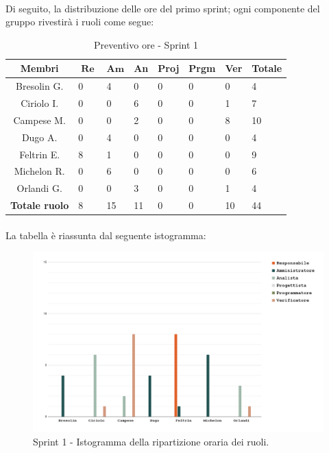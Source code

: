 \documentclass[10pt, a4paper]{article}
\begin{document}
{{{{{{{{\paragraph{}Di seguito, la distribuzione delle ore del primo sprint; ogni componente del gruppo rivestirà i ruoli come segue:
\begin{table}[H]
\begin{tabularx}{\textwidth}{c|X|X|X|X|X|X|X}
        \textbf{Membri} & $\operatorname{\textbf{Re}}$ & $\mathrm{\textbf{Am}}$ & \textbf{An} & \textbf{Proj} & \textbf{Prgm} & \textbf{Ver} & \textbf{Totale} \\
        \hline Bresolin G. & 0 & \cellcolor{primarycolor}4 & 0 & 0 & 0 & 0 & 4 \\
        \hline Ciriolo I.  & 0 & 0 & \cellcolor{primarycolor}6 & 0 & 0 & 1 & 7 \\
        \hline Campese M.  & 0 & 0 & 2 & 0 & 0 & \cellcolor{primarycolor}8 & 10 \\
        \hline Dugo A.     & 0 & \cellcolor{primarycolor}4 & 0 & 0 & 0 & 0 & 4 \\
        \hline Feltrin E.  & \cellcolor{primarycolor}8 & 1 & 0 & 0 & 0 & 0 & 9 \\
        \hline Michelon R. & 0 & \cellcolor{primarycolor}6 & 0 & 0 & 0 & 0 & 6 \\
        \hline Orlandi G.  & 0 & 0 & \cellcolor{primarycolor}3 & 0 & 0 & 1 & 4 \\
        \hline
        \textbf{Totale ruolo} & 8 & 15 & 11 & 0 & 0 & 10 & 44 
    \end{tabularx}
    \caption{Preventivo ore - Sprint 1}
    \end{table}

\paragraph{}La tabella è riassunta dal seguente istogramma:
 \begin{figure}[H]
        \centering        
        \includegraphics[width=15.5cm]{istogrammi/istogramma_1_periodo.png}
        \caption{Sprint 1 - Istogramma della ripartizione oraria dei ruoli. }
    \end{figure}
 
}}}}}}}}
\end{document}
